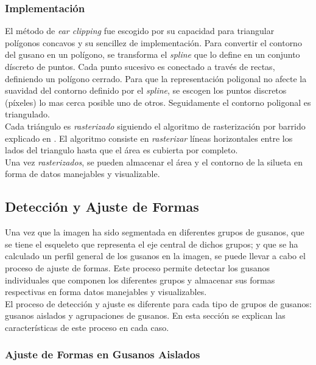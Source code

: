 \subsubsection{Implementaci\'on}

El m\'etodo de \emph{ear clipping} fue escogido por su capacidad para triangular pol\'igonos
concavos y su sencillez de implementaci\'on. Para convertir el contorno del gusano en un 
pol\'igono, se transforma el \emph{spline} que lo define en un conjunto d\'iscreto de puntos.
Cada punto sucesivo es conectado a trav\'es de rectas, definiendo un pol\'igono cerrado. 
Para que la representaci\'on poligonal no afecte la suavidad del contorno definido por el
\emph{spline}, se escogen los puntos discretos (p\'ixeles) lo mas cerca posible uno de otros.
Seguidamente el contorno poligonal es triangulado.\\

Cada tri\'angulo es \emph{rasterizado} siguiendo el algoritmo de rasterizaci\'on por barrido
explicado en \cite{scanconversion}. El algoritmo consiste en \emph{rasterizar} 
l\'ineas horizontales entre los lados del triangulo hasta que el \'area es cubierta por completo.\\

Una vez \emph{rasterizados}, se pueden almacenar el \'area y el contorno de la silueta en
forma de datos manejables y visualizable. 

\subsection{Detecci\'on y Ajuste de Formas}
\label{sec:metfit}

Una vez que la imagen ha sido segmentada en diferentes grupos de gusanos, que se tiene
el esqueleto que representa el eje central de dichos grupos; y que se ha calculado un
perfil general de los gusanos en la imagen, se puede llevar a cabo el proceso de ajuste
de formas. Este proceso permite detectar los gusanos individuales que componen los 
diferentes grupos y almacenar sus formas respectivas en forma datos manejables y visualizables.\\

El proceso de detecci\'on y ajuste es diferente para cada tipo de grupos de gusanos: 
gusanos aislados y agrupaciones de gusanos. En esta secci\'on se explican las 
caracter\'isticas de este proceso en cada caso.

\subsubsection{Ajuste de Formas en Gusanos Aislados}
\label{sec:metiso}


